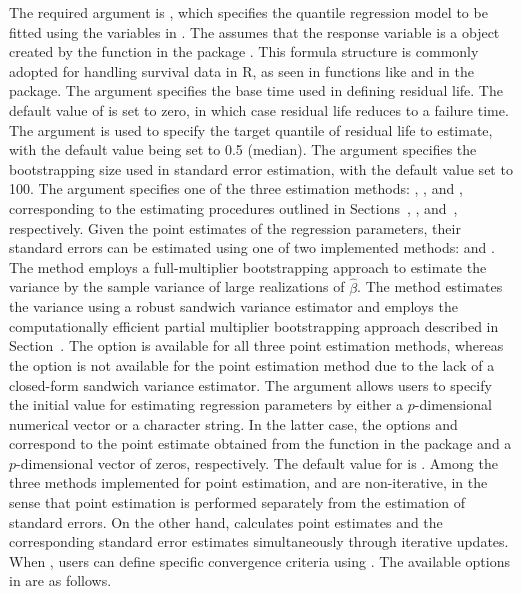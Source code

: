 The required argument is , 
which specifies the quantile regression model to be fitted using the variables in . 
The  assumes that the response variable is a  object 
created by the  function in the  package \citep{survivalpackage}. 
This formula structure is commonly adopted for handling survival data in R, as seen in functions 
like  and  in the  package.
The argument  specifies the base time used in defining residual life. 
The default value of  is set to zero, in which case residual life reduces to a failure time.
The  argument is used to specify the target quantile of residual life to estimate, 
with the default value being set to 0.5 (median).
The  argument specifies the bootstrapping size used in standard error estimation, 
with the default value set to 100.
The  argument specifies one of the three estimation methods: 
, , and , 
corresponding to the estimating procedures outlined in Sections~,
, and~, respectively. 
Given the point estimates of the regression parameters, 
their standard errors can be estimated using one of two implemented methods: 
 and .
The  method employs a full-multiplier bootstrapping approach to 
estimate the variance by the sample variance of large realizations of $\widehat\beta$.
The  method estimates the variance using a robust sandwich variance estimator 
and employs the computationally efficient partial multiplier bootstrapping approach described in 
Section~.
The  option is available for all three point estimation methods, 
whereas the  option is not available for the  
point estimation method due to the lack of a closed-form sandwich variance estimator.
The  argument allows users to specify the initial value for estimating regression parameters 
by either a $p$-dimensional numerical vector or a character string.
In the latter case, the options  and  correspond to 
the point estimate obtained from the  function in the  package 
and a $p$-dimensional vector of zeros, respectively. 
The default value for  is .
Among the three methods implemented for point estimation,  and 
 are non-iterative, 
in the sense that point estimation is performed separately from the estimation of standard errors.
On the other hand,  calculates point estimates and the corresponding 
standard error estimates simultaneously through iterative updates. 
When , users can define specific convergence criteria using .
The available options in  are as follows.

